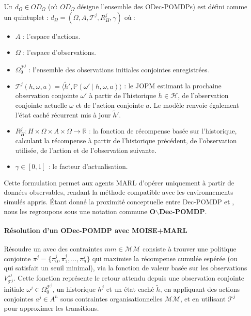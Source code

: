 Un  $d_\Omega \in OD_\Omega$ (où $OD_\Omega$ désigne l'ensemble des ODec-POMDPs) est défini comme un quintuplet :
%
$d_\Omega = \left(\Omega, A, \mathcal{T}^j, R^j_H, \gamma \right)$
%
où :
\begin{itemize}
    \item $A$ : l'espace d'actions.
    \item $\Omega$ : l'espace d'observations.
    \item $\Omega^{\mathcal{T}^j}_0$ : l'ensemble des observations initiales conjointes enregistrées.
    \item $\mathcal{T}^j(h, \omega, a) = \langle \tilde{h}', \mathbb{P}(\omega' \mid h, \omega, a) \rangle$ : le JOPM estimant la prochaine observation conjointe $\omega'$ à partir de l'historique $\tilde{h} \in \mathcal{H}$, de l'observation conjointe actuelle $\omega$ et de l'action conjointe $a$. Le modèle renvoie également l'état caché récurrent mis à jour $\tilde{h}'$.
    \item $R^j_H : H \times \Omega \times A \times \Omega \rightarrow \mathbb{R}$ : la fonction de récompense basée sur l'historique, calculant la récompense à partir de l'historique précédent, de l'observation utilisée, de l'action et de l'observation suivante.
    \item $\gamma \in [0, 1]$ : le facteur d'actualisation.
\end{itemize}

\noindent Cette formulation permet aux agents MARL d'opérer uniquement à partir de données observables, rendant la méthode compatible avec les environnements simulés appris. Étant donné la proximité conceptuelle entre Dec-POMDP et , nous les regroupons sous une notation commune \textbf{O$\backslash$Dec-POMDP}.

\paragraph{\textbf{Résolution d'un ODec-POMDP avec MOISE+MARL}}

Résoudre un  avec des contraintes $mm \in \mathcal{MM}$ consiste à trouver une politique conjointe $\pi^j = \{\pi^j_0, \pi^j_1, \dots, \pi^j_n\}$ qui maximise la récompense cumulée espérée (ou qui satisfait un seuil minimal), via la fonction de valeur basée sur les observations $V_{\mathcal{T}^j}^{\pi^j}$. Cette fonction représente le retour attendu depuis une observation conjointe initiale $\omega^j \in \Omega^{\mathcal{T}^j}_0$, un historique $h^j$ et un état caché $\tilde{h}$, en appliquant des actions conjointes $a^j \in A^n$ sous contraintes organisationnelles $\mathcal{MM}$, et en utilisant $\mathcal{T}^j$ pour approximer les transitions.

